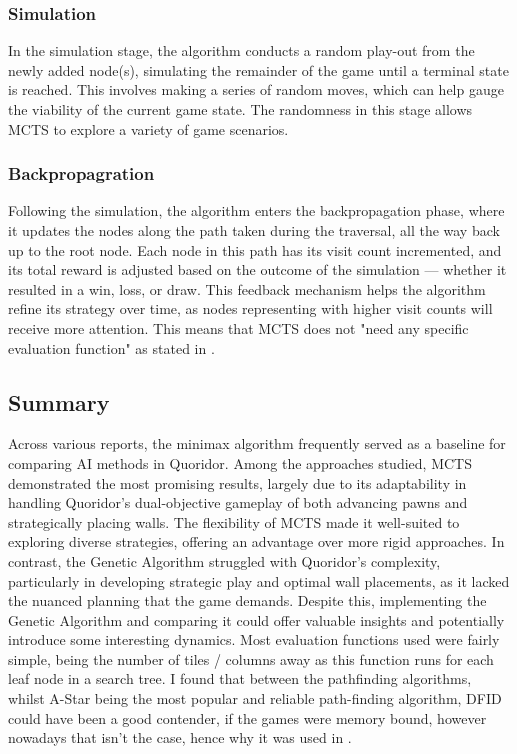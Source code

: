 \documentclass[review]{cmpreport}
\begin{document}
\subsubsection{Simulation}
In the simulation stage, the algorithm conducts a random play-out from the newly added node(s), simulating the remainder of the game until a terminal state is reached. This involves making a series of random moves, which can help gauge the viability of the current game state. The randomness in this stage allows MCTS to explore a variety of game scenarios.

\subsubsection{Backpropagration}
Following the simulation, the algorithm enters the backpropagation phase, where it updates the nodes along the path taken during the traversal, all the way back up to the root node. Each node in this path has its visit count incremented, and its total reward is adjusted based on the outcome of the simulation — whether it resulted in a win, loss, or draw. This feedback mechanism helps the algorithm refine its strategy over time, as nodes representing with higher visit counts will receive more attention. This means that MCTS does not "need any specific evaluation function" as stated in \cite{brenner2015artificial}.

\subsection{Summary}
Across various reports, the minimax algorithm frequently served as a baseline for comparing AI methods in Quoridor. Among the approaches studied, MCTS demonstrated the most promising results, largely due to its adaptability in handling Quoridor’s dual-objective gameplay of both advancing pawns and strategically placing walls. The flexibility of MCTS made it well-suited to exploring diverse strategies, offering an advantage over more rigid approaches. In contrast, the Genetic Algorithm struggled with Quoridor’s complexity, particularly in developing strategic play and optimal wall placements, as it lacked the nuanced planning that the game demands. Despite this, implementing the Genetic Algorithm and comparing it could offer valuable insights and potentially introduce some interesting dynamics.
\newline
\noindent Most evaluation functions used were fairly simple, being the number of tiles / columns away as this function runs for each leaf node in a search tree. I found that between the pathfinding algorithms, whilst A-Star being the most popular and reliable path-finding algorithm, DFID could have been a good contender, if the games were memory bound, however nowadays that isn't the case, hence why it was used in \cite{josequoridor}.
\end{document}
